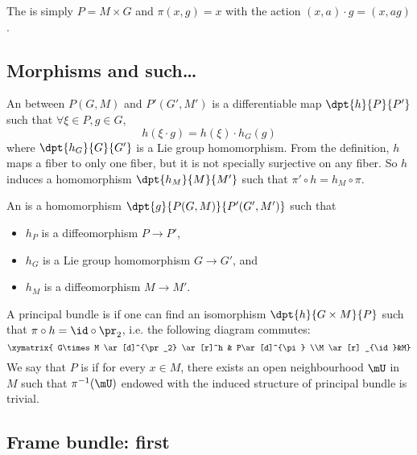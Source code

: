 The  is simply $P=M\times G$ and $\pi(x,g)=x$ with the action $(x,a)\cdot g=(x,ag)$.

\subsection{Morphisms and such\texorpdfstring{\ldots}{...}}

An  between $P(G,M)$ and $P'(G',M')$ is a differentiable map $\dpt{h}{P}{P'}$ such that $\forall \xi\in P,g\in G$, 
\begin{equation}\label{eq:def_princ_homo}
   h(\xi\cdot g)=h(\xi)\cdot h_G(g)
\end{equation}
where $\dpt{h_G}{G}{G'}$ is a Lie group homomorphism. From the definition, $h$ maps a fiber to only one fiber, but it is not specially surjective on any fiber. So $h$ induces a homomorphism $\dpt{h_M}{M}{M'}$ such that $\pi'\circ h=h_M\circ\pi$.

An  is a homomorphism $\dpt{g}{P(G,M)}{P'(G',M')}$ such that 

\begin{itemize}
\item $h_P$ is a diffeomorphism $P\to P'$,
\item $h_G$ is a Lie group homomorphism $G\to G'$, and
\item $h_M$ is a diffeomorphism $M\to M'$.
\end{itemize}

A principal bundle is  if one can find an isomorphism $\dpt{h}{G\times M}{P}$ such that $\pi\circ h=\id\circ\pr_2$, i.e. the following diagram commutes:
\begin{equation}\label{diag:princ_triv}
\xymatrix{ G\times M \ar[d]^{\pr_2} \ar[r]^h & P\ar[d]^{\pi} \\M \ar[r] _{\id}&M}
\end{equation}
We say that $P$ is  if for every $x\in M$, there exists an open neighbourhood $\mU$ in $M$ such that $\pi^{-1}(\mU)$ endowed with the induced structure of principal bundle is trivial.

\subsection{Frame bundle: first}\label{pg:frame_bundle}

